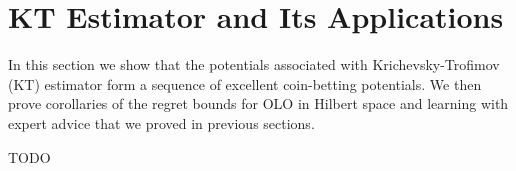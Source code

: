 \section{KT Estimator and Its Applications}
\label{section:kt-estimator}

In this section we show that the potentials associated with Krichevsky-Trofimov
(KT) estimator form a sequence of excellent coin-betting potentials. We then
prove corollaries of the regret bounds for OLO in Hilbert space and learning
with expert advice that we proved in previous sections.

TODO
